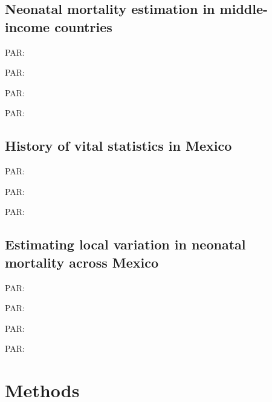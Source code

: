 \documentclass[
]{article}
\begin{document}
\hypertarget{neonatal-mortality-estimation-in-middle-income-countries}{%
\subsection{Neonatal mortality estimation in middle-income countries}\label{neonatal-mortality-estimation-in-middle-income-countries}}

PAR:

PAR:

PAR:

PAR:

\hypertarget{history-of-vital-statistics-in-mexico}{%
\subsection{History of vital statistics in Mexico}\label{history-of-vital-statistics-in-mexico}}

PAR:

PAR:

PAR:

\hypertarget{estimating-local-variation-in-neonatal-mortality-across-mexico}{%
\subsection{Estimating local variation in neonatal mortality across Mexico}\label{estimating-local-variation-in-neonatal-mortality-across-mexico}}

PAR:

PAR:

PAR:

PAR:

\hypertarget{methods}{%
\section{Methods}\label{methods}}
\end{document}
